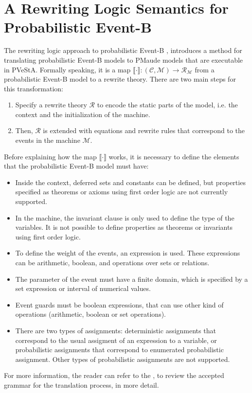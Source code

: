 \chapter{A Rewriting Logic Semantics for Probabilistic Event-B}
The rewriting logic approach to probabilistic Event-B \cite{Olarte}, introduces a method for translating probabilistic Event-B models to PMaude models that are executable in PVeStA. Formally speaking, it is a map $\llbracket \cdot \rrbracket: (\mathscr{C}, \mathscr{M}) \rightarrow \mathscr{R}_\mathscr{M}$ from a probabilistic Event-B model to a rewrite theory. There are two main steps for this transformation:

\begin{enumerate}
    \item Specify a rewrite theory $\mathscr{R}$ to encode the static parts of the model, i.e. the context and the initialization of the machine.
    \item Then, $\mathscr{R}$ is extended with equations and rewrite rules that correspond to the events in the machine $\mathscr{M}$.
\end{enumerate}

Before explaining how the map $\llbracket \cdot \rrbracket$ works, it is necessary to define the elements that the probabilistic Event-B model must have:
\begin{itemize}
    \item Inside the context, deferred sets and constants can be defined, but properties specified as theorems or axioms using first order logic are not currently supported.
    \item In the machine, the invariant clause is only used to define the type of the variables. It is not possible to define properties as theorems or invariants using first order logic.
    \item To define the weight of the events, an expression is used. These expressions can be arithmetic, boolean, and operations over sets or relations.
    \item The parameter of the event must have a finite domain, which is specified by a set expression or interval of numerical values.
    \item Event guards must be boolean expressions, that can use other kind of operations (arithmetic, boolean or set operations).
    \item There are two types of assignments: deterministic assignments that correspond to the usual assigment of an expression to a variable, or probabilistic assignments that correspond to enumerated probabilistic assignment. Other types of probabilistic assignments are not supported. 
\end{itemize}
For more information, the reader can refer to the \cite{tool.website}, to review the accepted grammar for the translation process, in more detail. 

